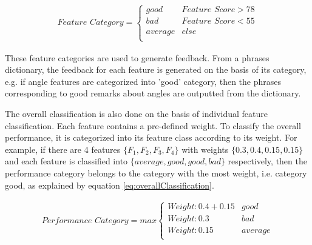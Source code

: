 \begin{align}
  \textit{Feature Category} = 
  \begin{cases}
    \textit{good} & \textit{Feature Score} > 78 \\
    \textit{bad} & \textit{Feature Score} < 55 \\
    \textit{average} & \textit{else}  \\
  \end{cases}
  \label{eq:classification}
\end{align}

These feature categories are used to generate feedback. From a phrases dictionary, the feedback for each feature is generated on the basis of its category, e.g. if angle features are categorized into 'good' category, then the phrases corresponding to good remarks about angles are outputted from the dictionary. 

The overall classification is also done on the basis of individual feature classification. Each feature contains a pre-defined weight. To classify the overall performance, it is categorized into its feature class according to its weight. For example, if there are 4 features $\{F_1, F_2, F_3,F_4\}$ with weights $\{0.3, 0.4, 0.15, 0.15\}$ and each feature is classified into $\{\textit{average}, \textit{good}, \textit{good},\textit{bad}\}$ respectively, then the performance category belongs to the category with the most weight, i.e. category good, as explained by equation \ref{eq:overallClassification}. 

\begin{align}
  \textit{Performance Category} = max
  \begin{cases}
    Weight: 0.4 + 0.15 & \textit{good} \\
    Weight: 0.3 & \textit{bad}  \\
    Weight: 0.15 & \textit{average} \\
  \end{cases} 
  \label{eq:overallClassification}
\end{align}




 
